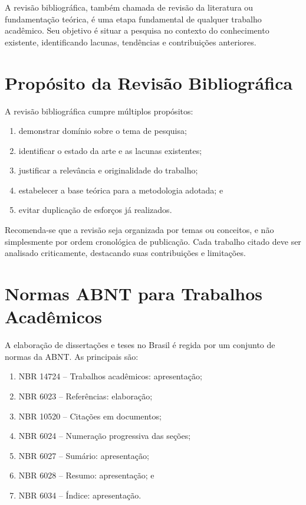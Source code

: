 A revisão bibliográfica, também chamada de revisão da literatura ou fundamentação teórica, é uma etapa fundamental de qualquer trabalho acadêmico. Seu objetivo é situar a pesquisa no contexto do conhecimento existente, identificando lacunas, tendências e contribuições anteriores.

\section{Propósito da Revisão Bibliográfica}

A revisão bibliográfica cumpre múltiplos propósitos:

\begin{enumerate}
    \item demonstrar domínio sobre o tema de pesquisa;
    \item identificar o estado da arte e as lacunas existentes;
    \item justificar a relevância e originalidade do trabalho;
    \item estabelecer a base teórica para a metodologia adotada; e
    \item evitar duplicação de esforços já realizados.
\end{enumerate}

Recomenda-se que a revisão seja organizada por temas ou conceitos, e não simplesmente por ordem cronológica de publicação. Cada trabalho citado deve ser analisado criticamente, destacando suas contribuições e limitações.

\section{Normas ABNT para Trabalhos Acadêmicos}

A elaboração de dissertações e teses no Brasil é regida por um conjunto de normas da \ac{ABNT}. As principais são:

\begin{enumerate}
    \item NBR 14724 -- Trabalhos acadêmicos: apresentação;
    \item NBR 6023 -- Referências: elaboração;
    \item NBR 10520 -- Citações em documentos;
    \item NBR 6024 -- Numeração progressiva das seções;
    \item NBR 6027 -- Sumário: apresentação;
    \item NBR 6028 -- Resumo: apresentação; e
    \item NBR 6034 -- Índice: apresentação.
\end{enumerate}

